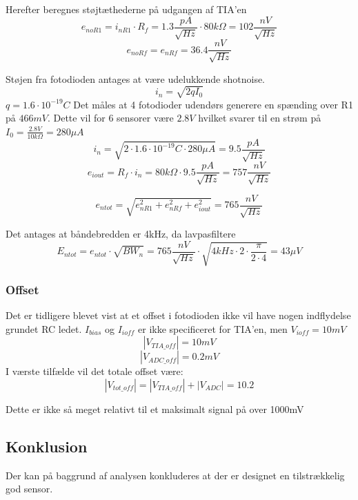 \documentclass[HardwareDesign/HardwareDesign_main.tex]{subfiles}
\begin{document}
Herefter beregnes støjtæthederne på udgangen af TIA'en
$$e_{noR1} = i_{nR1} \cdot R_f =1.3 \si{\frac{pA}{\sqrt{Hz}}} \cdot 80\si{k\Omega} = 102 \si{\frac{nV}{\sqrt{Hz}}}$$
$$e_{noRf} = e_{nRf} = 36.4 \si{\frac{nV}{\sqrt{Hz}}}$$

Støjen fra fotodioden antages at være udelukkende shotnoise.
$$i_n = \sqrt{2qI_0}$$
$q = 1.6\cdot 10^{-19} \si{C}$
Det måles at 4 fotodioder udendørs generere en spænding over R1 på $466\si{mV}$. Dette vil for 6 sensorer være $2.8\si{V}$ hvilket svarer til en strøm på $I_0 = \frac{2.8\si{V}}{10\si{k\Omega}} = 280\si{\mu A}$
$$i_n = \sqrt{2 \cdot 1.6\cdot 10^{-19} \si{C} \cdot 280\si{\mu A}} = 9.5 \si{\frac{pA}{\sqrt{Hz}}}$$
$$e_{iout} = R_f \cdot i_n = 80\si{k\Omega} \cdot 9.5 \si{\frac{pA}{\sqrt{Hz}}} = 757 \si{\frac{nV}{\sqrt{Hz}}}$$
 
$$e_{ntot} = \sqrt{e_{nR1}^2 + e_{nRf}^2 + e_{iout}^2} = 765\si{\frac{nV}{\sqrt{Hz}}}$$

Det antages at båndebredden er 4kHz, da lavpasfiltere
$$E_{ntot} = e_{ntot}\cdot \sqrt{BW_n} = 765\si{\frac{nV}{\sqrt{Hz}}}\cdot \sqrt{4\si{kHz}\cdot 2 \cdot \frac{\pi}{2\cdot4}} = 43 \si{\mu V}$$
\subsubsection{Offset}
Det er tidligere blevet vist at et offset i fotodioden ikke vil have nogen indflydelse grundet RC ledet. 
$I_{bias}$ og $I_{ioff}$ er ikke specificeret for TIA'en, men $V_{ioff} = 10mV$ 
$$|V_{TIA\_off}|= 10\si{mV}$$
$$|V_{ADC\_off}| = 0.2\si{mV}$$
I værste tilfælde vil det totale offset være:
$$|V_{tot\_off}| = |V_{TIA\_off}|+|V_{ADC}| = 10.2$$

Dette er ikke så meget relativt til et maksimalt signal på over 1000mV

\subsection{Konklusion}
Der kan på baggrund af analysen konkluderes at der er designet en tilstrækkelig god sensor. 
\end{document}
